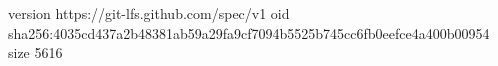 version https://git-lfs.github.com/spec/v1
oid sha256:4035cd437a2b48381ab59a29fa9cf7094b5525b745cc6fb0eefce4a400b00954
size 5616
